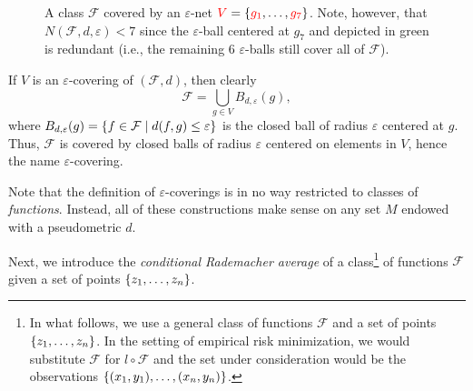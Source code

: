 \begin{figure}
    \centering
    \caption{%
         A class $\mathcal{F}$ covered by an $\varepsilon$-net ${\color{red} V} = \left\{{\color{red} g_1}, \dots, {\color{red} g_7}\right\}$. Note, however, that $N(\mathcal{F}, d, \varepsilon) < 7$ since the $\varepsilon$-ball centered at $g_7$ and depicted in green is redundant (i.e., the remaining 6 $\varepsilon$-balls still cover all of $\mathcal{F}$).
    }
    \label{fig: epsilon-net}
\end{figure}

If $V$ is an $\varepsilon$-covering of $(\mathcal{F}, d)$, then clearly
\[
    \mathcal{F} = \bigcup_{g \in V} B_{d, \varepsilon}(g),
\]
where $B_{d, \varepsilon}(g) = \left\{f \in \mathcal{F} \mathrel{|} d(f, g) \leq \varepsilon\right\}$ is the closed ball of radius $\varepsilon$ centered at $g$. Thus, $\mathcal{F}$ is covered by closed balls of radius $\varepsilon$ centered on elements in $V$, hence the name $\varepsilon$-covering.

Note that the definition of $\varepsilon$-coverings is in no way restricted to classes of \emph{functions}. Instead, all of these constructions make sense on any set $M$ endowed with a pseudometric $d$.

Next, we introduce the \emph{conditional Rademacher average} of a class\footnote{In what follows, we use a general class of functions $\mathcal{F}$ and a set of points $\left\{z_1, \dots, z_n\right\}$. In the setting of empirical risk minimization, we would substitute $\mathcal{F}$ for $l \circ \mathcal{F}$ and the set under consideration would be the observations $\left\{(x_1, y_1), \dots, (x_n, y_n)\right\}$.} of functions $\mathcal{F}$ given a set of points $\left\{z_1, \dots, z_n\right\}$.


